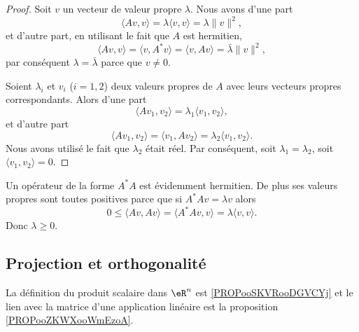 \begin{proof}
	Soit \( v\) un vecteur de valeur propre \( \lambda\). Nous avons d'une part
	\begin{equation}
		\langle Av, v\rangle =\lambda\langle v, v\rangle =\lambda\| v \|^2,
	\end{equation}
	et d'autre part, en utilisant le fait que \( A\) est hermitien,
	\begin{equation}
		\langle Av, v\rangle =\langle v, A^*v\rangle =\langle v, Av\rangle =\bar\lambda\| v \|^2,
	\end{equation}
	par conséquent \( \lambda=\bar\lambda\) parce que \( v\neq 0\).

	Soient \( \lambda_i\) et \( v_i\) (\( i=1,2\)) deux valeurs propres de \( A\) avec leurs vecteurs propres correspondants. Alors d'une part
	\begin{equation}
		\langle Av_1, v_2\rangle =\lambda_1\langle v_1, v_2\rangle ,
	\end{equation}
	et d'autre part
	\begin{equation}
		\langle Av_1, v_2\rangle =\langle v_1, Av_2\rangle =\lambda_2\langle v_1, v_2\rangle .
	\end{equation}
	Nous avons utilisé le fait que \( \lambda_2\) était réel. Par conséquent, soit \( \lambda_1=\lambda_2\), soit \( \langle v_1, v_2\rangle =0\).
\end{proof}

\begin{remark}      \label{REMooMLBCooTuKFmz}
	Un opérateur de la forme \( A^*A\) est évidemment hermitien. De plus ses valeurs propres sont toutes positives parce que si \( A^*Av=\lambda v\) alors
	\begin{equation}
		0\leq \langle Av, Av\rangle =\langle A^*Av, v\rangle =\lambda\langle v, v\rangle .
	\end{equation}
	Donc \( \lambda\geq 0\).
\end{remark}

\subsection{Projection et orthogonalité}

La définition du produit scalaire dans \( \eR^n\) est \ref{PROPooSKVRooDGVCYj} et le lien avec la matrice d'une application linéaire est la proposition \ref{PROPooZKWXooWmEzoA}.

